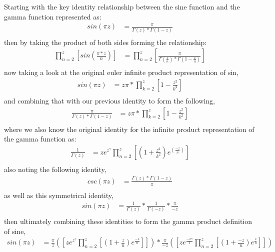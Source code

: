 \documentclass{article}
\begin{document}
Starting with the key identity relationship between the sine function and the gamma function represented as:
\begin{align*}
sin(\pi z) &= \frac{\pi}{\Gamma\left(z\right) * \Gamma\left(1 - z\right)} \\
\end{align*}
then by taking the product of both sides forming the relationship:
\begin{align*}
\prod_{n=2}^z\left[sin(\frac{\pi * z}{n})\right] &= \prod_{n=2}^z\left[\frac{\pi}{\Gamma\left(\frac{z}{n}\right) * \Gamma\left(1 - \frac{z}{n}\right)}\right] \\
\end{align*}
now taking a look at the original euler infinite product representation of sin,
\begin{align*}
sin(\pi z) &= z\pi * \prod_{k=2}^z\left[1 - \frac{z^2}{k^2}\right] \\
\end{align*}
and combining that with our previous identity to form the following,
\begin{align*}
\frac{\pi}{\Gamma\left(z\right) * \Gamma\left(1 - z\right)} &= z\pi * \prod_{k=2}^z\left[1 - \frac{z^2}{k^2}\right] \\
\end{align*}
where we also know the original identity for the infinite product representation of the gamma function as:
\begin{align*}
\frac{1}{\Gamma\left(z\right)} &= ze^z^\gamma \prod_{n=2}^z\left[\left(1 + \frac{z^2}{k^2}\right)e^\left(\frac{-z}{n}\right)\right] \\
\end{align*}
also noting the following identity,
\begin{align*}
csc(\pi z) &= \frac{\Gamma\left(z\right) * \Gamma\left(1 - z\right)}{\pi} \\
\end{align*}
as well as this symmetrical identity,
\begin{align*}
sin(\pi z) &= \frac{1}{\Gamma\left(z\right)} * \frac{1}{\Gamma\left(- z\right)} * \frac{\pi}{-z} \\
\end{align*}
then ultimately combining these identities to form the gamma product definition of sine,
\begin{align*}
sin(\pi z) &= \frac{\pi}{z} \left(\left[ze^z^\gamma \prod_{n=2}^z \left[\left(1 + \frac{z}{n}\right)e^\frac{-z}{n}\right]\right]\right) * \frac{\pi}{-z} \left(\left[ze^\frac{-z\gamma}{1} \prod_{n=2}^z \left[\left(1 + \frac{-z}{n}\right)e^\frac{z}{n}\right]\right]\right)
\end{align*}
\end{document}

